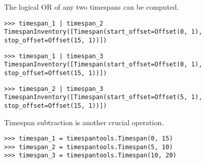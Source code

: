 The logical OR of any two timespans can be computed.

\begin{comment}
<abjad>
timespan_1 | timespan_2
timespan_1 | timespan_3
timespan_2 | timespan_3
</abjad>
\end{comment}

\begin{singlespacing}
\vspace{-0.5\baselineskip}
\begin{lstlisting}
>>> timespan_1 | timespan_2
TimespanInventory([Timespan(start_offset=Offset(0, 1), stop_offset=Offset(15, 1))])
\end{lstlisting}
\begin{lstlisting}
>>> timespan_1 | timespan_3
TimespanInventory([Timespan(start_offset=Offset(0, 1), stop_offset=Offset(15, 1))])
\end{lstlisting}
\begin{lstlisting}
>>> timespan_2 | timespan_3
TimespanInventory([Timespan(start_offset=Offset(5, 1), stop_offset=Offset(15, 1))])
\end{lstlisting}
\end{singlespacing}

Timespan subtraction is another crucial operation.

\begin{comment}
<abjad>
timespan_1 = timespantools.Timespan(0, 15)
timespan_2 = timespantools.Timespan(5, 10)
timespan_3 = timespantools.Timespan(10, 20)
</abjad>
\end{comment}

\begin{singlespacing}
\vspace{-0.5\baselineskip}
\begin{lstlisting}
>>> timespan_1 = timespantools.Timespan(0, 15)
>>> timespan_2 = timespantools.Timespan(5, 10)
>>> timespan_3 = timespantools.Timespan(10, 20)
\end{lstlisting}
\end{singlespacing}

\begin{comment}
<abjad>
print(format(timespan_1 - timespan_1))
print(format(timespan_1 - timespan_2))
print(format(timespan_1 - timespan_3))
print(format(timespan_2 - timespan_1))
print(format(timespan_2 - timespan_2))
print(format(timespan_2 - timespan_3))
print(format(timespan_3 - timespan_1))
print(format(timespan_3 - timespan_2))
print(format(timespan_3 - timespan_3))
</abjad>
\end{comment}

